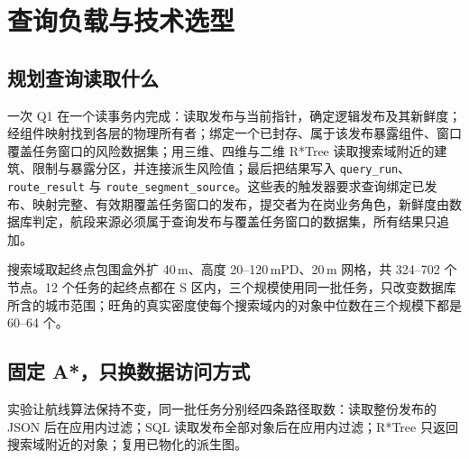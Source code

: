 \documentclass[a4paper,11pt,UTF8]{ctexart}
\begin{document}
\section{查询负载与技术选型}\label{sec:query}

\subsection{规划查询读取什么}

一次 Q1 在一个读事务内完成：读取发布与当前指针，确定逻辑发布及其新鲜度；经组件映射找到各层的物理所有者；绑定一个已封存、属于该发布暴露组件、窗口覆盖任务窗口的风险数据集；用三维、四维与二维 R*Tree 读取搜索域附近的建筑、限制与暴露分区，并连接派生风险值；最后把结果写入 \texttt{query\_run}、\texttt{route\_result} 与 \texttt{route\_segment\_source}。这些表的触发器要求查询绑定已发布、映射完整、有效期覆盖任务窗口的发布，提交者为在岗业务角色，新鲜度由数据库判定，航段来源必须属于查询发布与覆盖任务窗口的数据集，所有结果只追加。

搜索域取起终点包围盒外扩 40\,m、高度 20–120\,mPD、20\,m 网格，共 324–702 个节点。12 个任务的起终点都在 S 区内，三个规模使用同一批任务，只改变数据库所含的城市范围；旺角的真实密度使每个搜索域内的对象中位数在三个规模下都是 60–64 个。

\subsection{固定 A*，只换数据访问方式}

实验让航线算法保持不变，同一批任务分别经四条路径取数：读取整份发布的 JSON 后在应用内过滤；SQL 读取发布全部对象后在应用内过滤；R*Tree 只返回搜索域附近的对象；复用已物化的派生图。
\end{document}
